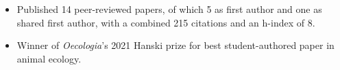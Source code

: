 


\begin{itemize}[noitemsep] 
  \item Published 14 peer-reviewed papers, of which 5 as first author and one as shared first author, with a combined 215 citations and an h-index of 8.
  \item Winner of \textit{Oecologia}'s 2021 Hanski prize for best student-authored paper in animal ecology.
\end{itemize}